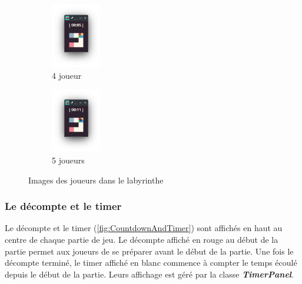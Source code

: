 \begin{figure}[!htb]
\begin{subfigure}{2.2cm}
        \label{fig:3Players}
    \end{subfigure}
    \qquad
    \begin{subfigure}{2.2cm}
        \includegraphics[width=2.2cm]{ressources/Implementation/Labyrinthe/Vue/Players/4Players.png}%
        \caption{4 joueur}
        \label{fig:4Players}
    \end{subfigure}
    \qquad
    \begin{subfigure}{2.2cm}
        \includegraphics[width=2.2cm]{ressources/Implementation/Labyrinthe/Vue/Players/5Players.png}%
        \caption{5 joueurs}
        \label{fig:5Players}
    \end{subfigure}
    \caption{Images des joueurs dans le labyrinthe}
    \label{fig:PlayersInLabyrinth}
\end{figure}
\FloatBarrier

\subsubsection*{Le décompte et le timer}

Le décompte et le timer (\ref{fig:CountdownAndTimer}) sont affichés en haut au centre de chaque partie de jeu. Le décompte affiché en rouge au début de la partie permet aux joueurs de se préparer avant le début de la partie. Une fois le décompte terminé, le timer affiché en blanc commence à compter le temps écoulé depuis le début de la partie. Leurs affichage est géré par la classe \textbf{\textit{TimerPanel}}.

